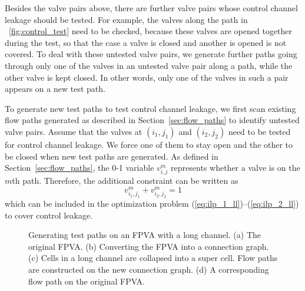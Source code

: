 Besides the valve pairs above, there are further valve pairs whose control channel
leakage should be tested. For example, the valves 
along the path in \figname~\ref{fig:control_test} need to be checked,
because these valves are opened together during the test, so that the case a
valve is closed and another is opened is not covered. To deal with these
untested valve pairs, we generate further paths going through only one of the valves
in an untested valve pair along a path, while the other valve is kept closed. 
In other words, only one of the valves in such a pair appears on a new test path. 

To generate new test paths to test control channel leakage, we first scan
existing flow paths generated as described in Section~\ref{sec:flow_paths} to
identify untested valve pairs.  
Assume that the valves at $(i_1,j_1)$ and $(i_2,j_2)$ 
need to be
tested for control channel leakage. We force one of them to stay open and the other to be
closed when new test paths are generated. As defined in 
Section~\ref{sec:flow_paths}, the 0-1 variable $v^m_{i,j}$ represents whether a
valve is on the $m$th path. Therefore, the additional constraint 
can be written as
\begin{equation}
v^m_{i_1,j_1}+v^m_{i_2,j_2}=1
\end{equation}
which can be included in the optimization problem
(\ref{eq:ilp_1_ll})--(\ref{eq:ilp_2_ll}) to cover control leakage.


\begin{figure}
{\figurefontsize
\centering

\caption{Generating test paths on an FPVA with a long channel. (a) The original
  FPVA. (b) Converting the FPVA into a connection graph. (c) Cells
  in a long channel are collapsed into a super cell. Flow paths are constructed on
  the new connection graph. (d) A corresponding flow path on the original
FPVA.}
\label{fig:super_cell}
}
\end{figure}

